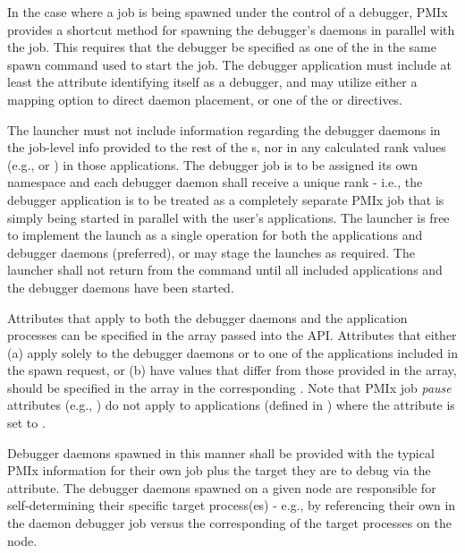 {In the case where a job is being spawned under the control of a debugger, \ac{PMIx} provides a shortcut method for spawning the debugger's daemons in parallel with the job. This requires that the debugger be specified as one of the  in the same spawn command used to start the job. The debugger application must include at least the  attribute identifying itself as a debugger, and may utilize either a mapping option to direct daemon placement, or one of the  or  directives.

The launcher must not include information regarding the debugger daemons in
the job-level info
provided to the rest of the s, nor in any calculated rank
values (e.g.,  or ) in those applications. The
debugger job is to be assigned its own namespace and each debugger daemon shall
receive a unique rank - i.e., the debugger application is to be treated as a
completely separate \ac{PMIx} job that is simply being started in parallel with
the user's applications. The launcher is free to implement the launch as a
single operation for both the applications and debugger daemons (preferred), or
may stage the launches as required. The launcher shall not return from the
 command until all included applications and the debugger
daemons have been started.

Attributes that apply to both the debugger daemons and the application processes can
be specified in the  array passed into the
 \ac{API}. Attributes that either (a) apply solely to the
debugger daemons or to one of the applications included in the spawn request,
or (b) have values that differ from those provided in the 
array, should be specified in the  array in the corresponding
.
Note that \ac{PMIx} job \emph{pause} attributes (e.g., ) do not apply to applications (defined in ) where the  attribute is set to .

Debugger daemons spawned in this manner shall be provided with the typical
\ac{PMIx} information for their own job plus the target they are to debug via
the  attribute. The debugger daemons spawned on a
given node are responsible for self-determining their specific target
process(es) - e.g., by referencing their own  in the
daemon debugger job versus the corresponding  of the
target processes on the node.

}
